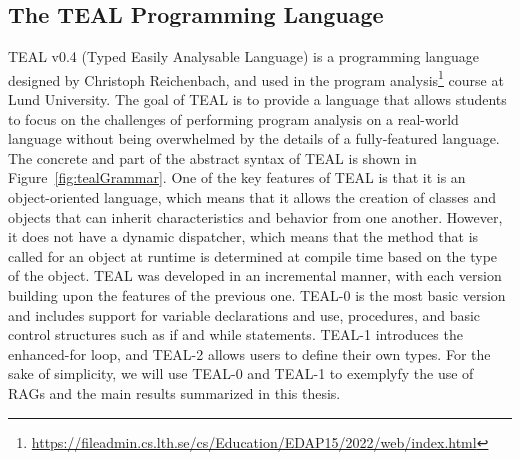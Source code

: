 \subsection{The TEAL Programming Language}
TEAL v0.4 (Typed Easily Analysable Language) is a programming language designed by Christoph Reichenbach, and  used in the
program analysis\footnote{\url{https://fileadmin.cs.lth.se/cs/Education/EDAP15/2022/web/index.html}} course at Lund University.
The goal of TEAL is to provide a language that allows students to
focus on the challenges of performing program analysis on a real-world language
without being overwhelmed by the details of a fully-featured language.
The concrete and part of the abstract syntax of TEAL is shown in Figure~\ref{fig:tealGrammar}.
One of the key features of TEAL is that it is an object-oriented language,
which means that it allows the creation of classes and objects that can inherit
characteristics and behavior from one another. However, it does not have a dynamic
dispatcher, which means that the method that is called for an object at runtime
is determined at compile time based on the type of the object.
TEAL was developed in an incremental manner, with each version building
upon the features of the previous one. TEAL-0 is the most basic version and includes
support for variable declarations and use, procedures, and basic control structures such as if
and while statements. TEAL-1 introduces the enhanced-for loop, and TEAL-2 allows users to
define their own types.
For the sake of simplicity, we will use TEAL-0 and TEAL-1 to exemplyfy the use of RAGs 
and the main results summarized in this thesis.

